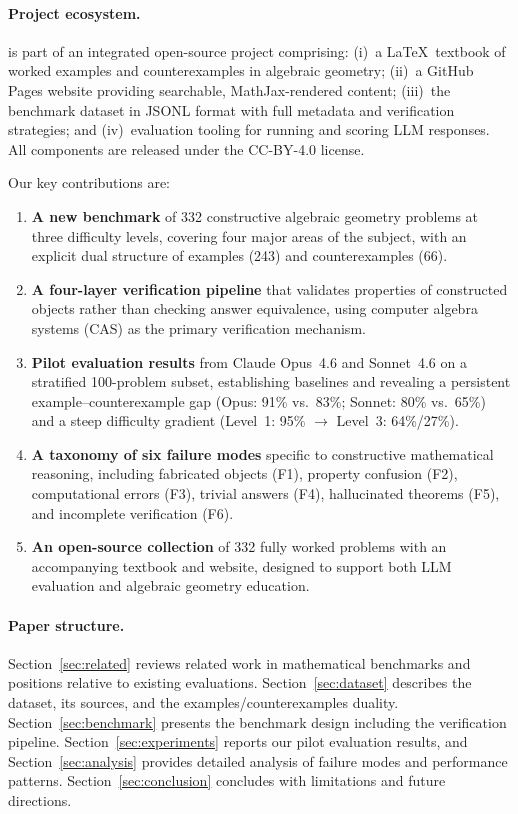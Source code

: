 \paragraph{Project ecosystem.}
\ecagbench{} is part of an integrated open-source project comprising:
(i)~a \LaTeX\ textbook of worked examples and counterexamples in algebraic geometry;
(ii)~a GitHub Pages website providing searchable, MathJax-rendered content;
(iii)~the benchmark dataset in JSONL format with full metadata and verification strategies; and
(iv)~evaluation tooling for running and scoring LLM responses.
All components are released under the CC-BY-4.0 license.

Our key contributions are:
\begin{enumerate}[nosep]
  \item \textbf{A new benchmark} of 332 constructive algebraic geometry problems at three difficulty levels, covering four major areas of the subject, with an explicit dual structure of examples (243) and counterexamples (66).
  \item \textbf{A four-layer verification pipeline} that validates properties of constructed objects rather than checking answer equivalence, using computer algebra systems (CAS) as the primary verification mechanism.
  \item \textbf{Pilot evaluation results} from Claude Opus~4.6 and Sonnet~4.6 on a stratified 100-problem subset, establishing baselines and revealing a persistent example--counterexample gap (Opus: 91\% vs.\ 83\%; Sonnet: 80\% vs.\ 65\%) and a steep difficulty gradient (Level~1: 95\% $\to$ Level~3: 64\%/27\%).
  \item \textbf{A taxonomy of six failure modes} specific to constructive mathematical reasoning, including fabricated objects (F1), property confusion (F2), computational errors (F3), trivial answers (F4), hallucinated theorems (F5), and incomplete verification (F6).
  \item \textbf{An open-source collection} of 332 fully worked problems with an accompanying textbook and website, designed to support both LLM evaluation and algebraic geometry education.
\end{enumerate}

\paragraph{Paper structure.}
Section~\ref{sec:related} reviews related work in mathematical benchmarks and positions \ecagbench{} relative to existing evaluations.
Section~\ref{sec:dataset} describes the dataset, its sources, and the examples/counterexamples duality.
Section~\ref{sec:benchmark} presents the benchmark design including the verification pipeline.
Section~\ref{sec:experiments} reports our pilot evaluation results, and Section~\ref{sec:analysis} provides detailed analysis of failure modes and performance patterns.
Section~\ref{sec:conclusion} concludes with limitations and future directions.
